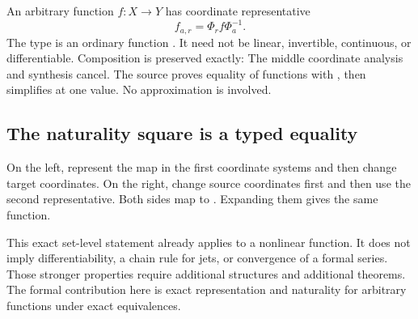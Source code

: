 An arbitrary function $f:X\to Y$ has coordinate representative
\[
 f_{a,r}=\Phi_r f\Phi_a^{-1}.
\]
The type is an ordinary function . It need not be linear, invertible, continuous, or differentiable. Composition is preserved exactly:
The middle coordinate analysis and synthesis cancel. The source proves equality of functions with , then simplifies at one value. No approximation is involved.

\subsection{The naturality square is a typed equality}
On the left, represent the map in the first coordinate systems and then change target coordinates. On the right, change source coordinates first and then use the second representative. Both sides map  to . Expanding them gives the same function.

This exact set-level statement already applies to a nonlinear function. It does not imply differentiability, a chain rule for jets, or convergence of a formal series. Those stronger properties require additional structures and additional theorems. The formal contribution here is exact representation and naturality for arbitrary functions under exact equivalences.

